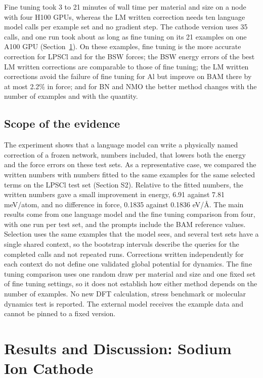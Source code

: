 Fine tuning took 3 to 21 minutes of wall time per material and size on a node with four H100 GPUs, whereas the LM written correction needs ten language model calls per example set and no gradient step. The cathode version uses 35 calls, and one run took about as long as fine tuning on its 21 examples on one A100 GPU (Section~\ref{sec:cathode}). On these examples, fine tuning is the more accurate correction for LPSCl and for the BSW forces; the BSW energy errors of the best LM written corrections are comparable to those of fine tuning; the LM written corrections avoid the failure of fine tuning for Al but improve on BAM there by at most 2.2\% in force; and for BN and NMO the better method changes with the number of examples and with the quantity.

\subsection{Scope of the evidence}

The experiment shows that a language model can write a physically named correction of a frozen network, numbers included, that lowers both the energy and the force errors on these test sets. As a representative case, we compared the written numbers with numbers fitted to the same examples for the same selected terms on the LPSCl test set (Section S2). Relative to the fitted numbers, the written numbers gave a small improvement in energy, 6.91 against 7.81 meV/atom, and no difference in force, 0.1835 against 0.1836 eV/\AA. The main results come from one language model and the fine tuning comparison from four, with one run per test set, and the prompts include the BAM reference values. Selection uses the same examples that the model sees, and several test sets have a single shared context, so the bootstrap intervals describe the queries for the completed calls and not repeated runs. Corrections written independently for each context do not define one validated global potential for dynamics. The fine tuning comparison uses one random draw per material and size and one fixed set of fine tuning settings, so it does not establish how either method depends on the number of examples. No new DFT calculation, stress benchmark or molecular dynamics test is reported. The external model receives the example data and cannot be pinned to a fixed version.

\fi

\clearpage
\section{Results and Discussion: Sodium Ion Cathode}
\label{sec:cathode}

